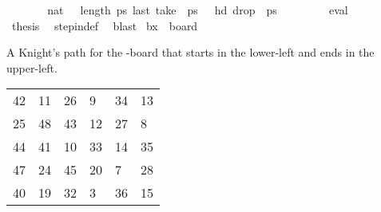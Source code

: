 \begin{isabellebody}
%
\isadelimproof
%
\endisadelimproof
%
\isatagproof
{}\isamarkupfalse%
\ {\isacharminus}{\kern0pt}\isanewline
\ \ \isamarkupfalse%
\ {\isachardoublequoteopen}{}\ {\isacharless}{\kern0pt}\ {\isacharparenleft}{\kern0pt}{}{}{\isacharcolon}{\kern0pt}{\isacharcolon}{\kern0pt}nat{\isacharparenright}{\kern0pt}{\isachardoublequoteclose}\ {\isachardoublequoteopen}{}{}\ {\isacharless}{\kern0pt}\ length\ {\isacharquery}{\kern0pt}ps{\isachardoublequoteclose}\ {\isachardoublequoteopen}last\ {\isacharparenleft}{\kern0pt}take\ {}{}\ {\isacharquery}{\kern0pt}ps{\isacharparenright}{\kern0pt}\ {\isacharequal}{\kern0pt}\ {\isacharparenleft}{\kern0pt}{}{\isacharcomma}{\kern0pt}{}{\isacharparenright}{\kern0pt}{\isachardoublequoteclose}\ {\isachardoublequoteopen}hd\ {\isacharparenleft}{\kern0pt}drop\ {}{}\ {\isacharquery}{\kern0pt}ps{\isacharparenright}{\kern0pt}\ {\isacharequal}{\kern0pt}\ {\isacharparenleft}{\kern0pt}{}{\isacharcomma}{\kern0pt}{}{\isacharparenright}{\kern0pt}{\isachardoublequoteclose}\ \isanewline
\ \ \ \ \isamarkupfalse%
\ eval{\isacharplus}{\kern0pt}\isanewline
\ \ \isamarkupfalse%
\ \isamarkupfalse%
\ {\isacharquery}{\kern0pt}thesis\ \isamarkupfalse%
\ step{\isacharunderscore}{\kern0pt}in{\isacharunderscore}{\kern0pt}def\ \isamarkupfalse%
\ blast\isanewline
{}\isamarkupfalse%
%
\endisatagproof
{\isafoldproof}%
%
\isadelimproof
\isanewline
%
\endisadelimproof
\isanewline
{}\isamarkupfalse%
\ {\isachardoublequoteopen}b{}x{}\ {\isasymequiv}\ board\ {}\ {}{\isachardoublequoteclose}%
\begin{isamarkuptext}%
A Knight's path for the -board that starts in the lower-left and ends in the 
upper-left.
  \begin{table}[H]
    \begin{tabular}{llllll}
      42 & 11 & 26 &  9 & 34 & 13 \\
      25 & 48 & 43 & 12 & 27 &  8 \\
      44 & 41 & 10 & 33 & 14 & 35 \\
      47 & 24 & 45 & 20 &  7 & 28 \\
      40 & 19 & 32 &  3 & 36 & 15 \\

\end{tabular}
\end{table}
\end{isamarkuptext}
\end{isabellebody}
